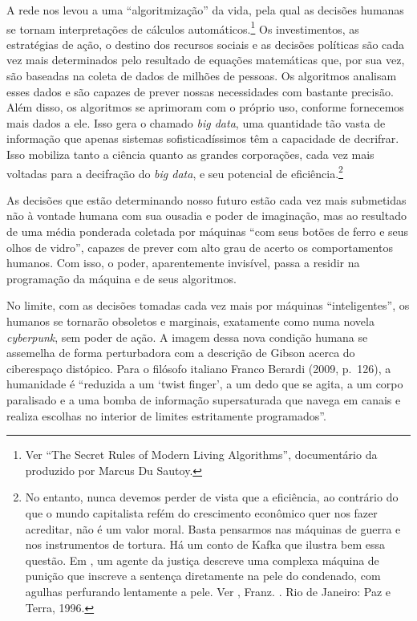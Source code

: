 A rede nos levou a uma ``algoritmização'' da vida, pela qual as decisões
humanas se tornam interpretações de cálculos automáticos.\footnote{Ver ``The Secret Rules of Modern Living Algorithms'', documentário da  produzido por Marcus Du Sautoy.} Os
investimentos, as estratégias de ação, o destino dos recursos sociais e
as decisões políticas são cada vez mais determinados pelo resultado de
equações matemáticas que, por sua vez, são baseadas na coleta de dados
de milhões de pessoas. Os algoritmos analisam esses dados e são capazes de prever nossas necessidades com bastante precisão. Além disso, os algoritmos se aprimoram com o próprio uso, conforme fornecemos mais dados a ele. Isso gera o chamado \emph{big data}, uma quantidade tão vasta de informação que apenas sistemas sofisticadíssimos têm a capacidade de decrifrar. Isso mobiliza tanto a ciência quanto as grandes corporações, cada vez mais voltadas para a decifração do \emph{big data}, e seu potencial de eficiência.\footnote{No entanto, nunca devemos perder de vista que a eficiência, ao contrário do que o mundo capitalista refém do crescimento econômico quer nos fazer acreditar, não é um valor moral. Basta pensarmos nas máquinas de guerra e nos instrumentos de tortura. Há um conto de Kafka que ilustra bem essa questão. Em {}, um agente da justiça descreve uma complexa máquina de punição que inscreve a sentença diretamente na pele do condenado, com agulhas perfurando lentamente a pele. Ver , Franz. {}. Rio de Janeiro: Paz e Terra, 1996.}

As decisões que estão determinando nosso futuro
estão cada vez mais submetidas não à vontade humana com sua ousadia e
poder de imaginação, mas ao resultado de uma média ponderada coletada
por máquinas ``com seus botões de ferro e seus olhos de vidro'', capazes
de prever com alto grau de acerto os comportamentos humanos. Com isso,
o poder, aparentemente invisível, passa a residir na programação da
máquina e de seus algoritmos.

No limite, com as decisões tomadas cada vez mais por máquinas
``inteligentes'', os humanos se tornarão obsoletos e marginais,
exatamente como numa novela \emph{cyberpunk}, sem poder de ação. A imagem dessa
nova condição humana se assemelha de forma perturbadora com a descrição
de Gibson acerca do ciberespaço distópico. Para o filósofo italiano
Franco Berardi (2009, p.~126), a humanidade é ``reduzida a um `twist
finger', a um dedo que se agita, a um corpo paralisado e a uma bomba de
informação supersaturada que navega em canais e realiza escolhas no
interior de limites estritamente programados''.

